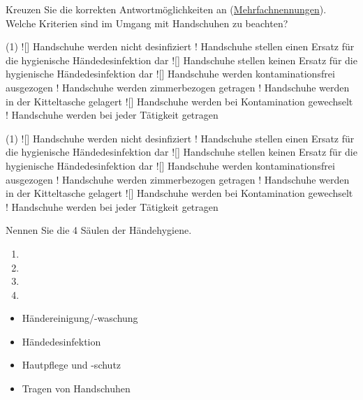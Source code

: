 \documentclass[a4paper]{scrartcl}
\begin{document}
\begin{aufgabe}{4}
	Kreuzen Sie die korrekten Antwortmöglichkeiten an (\underline{Mehrfachnennungen}). Welche Kriterien sind im Umgang mit Handschuhen zu beachten?
	\begin{center}
		\begin{mcumgebung}(1)
			\choice![\mcrichtig] Handschuhe werden nicht desinfiziert
			\choice! Handschuhe stellen einen Ersatz für die hygienische Händedesinfektion dar
			\choice![\mcrichtig] Handschuhe stellen keinen Ersatz für die hygienische Händedesinfektion dar
			\choice![\mcrichtig] Handschuhe werden kontaminationsfrei ausgezogen
			\choice! Handschuhe werden zimmerbezogen getragen
			\choice! Handschuhe werden in der Kitteltasche gelagert
			\choice![\mcrichtig] Handschuhe werden bei Kontamination gewechselt
			\choice! Handschuhe werden bei jeder Tätigkeit getragen
		\end{mcumgebung}
	\end{center}
	
	\begin{loesung}
		\begin{mcumgebung}(1)
			\choice![\mcrichtig] Handschuhe werden nicht desinfiziert
			\choice! Handschuhe stellen einen Ersatz für die hygienische Händedesinfektion dar
			\choice![\mcrichtig] Handschuhe stellen keinen Ersatz für die hygienische Händedesinfektion dar
			\choice![\mcrichtig] Handschuhe werden kontaminationsfrei ausgezogen
			\choice! Handschuhe werden zimmerbezogen getragen
			\choice! Handschuhe werden in der Kitteltasche gelagert
			\choice![\mcrichtig] Handschuhe werden bei Kontamination gewechselt
			\choice! Handschuhe werden bei jeder Tätigkeit getragen
		\end{mcumgebung}
	\end{loesung}
\end{aufgabe}



\begin{aufgabe}{4}
	Nennen Sie die 4 Säulen der Händehygiene.
	\begin{enumerate}
		\item \luecke{.9\textwidth}
		\item \luecke{.9\textwidth}
		\item \luecke{.9\textwidth}
		\item \luecke{.9\textwidth}
	\end{enumerate}
	
	\begin{loesung}
		\begin{itemize}
			\item Händereinigung/-waschung
			\item Händedesinfektion
			\item Hautpflege und -schutz
			\item Tragen von Handschuhen
		\end{itemize}
		
	\end{loesung}
\end{aufgabe}
\end{document}
